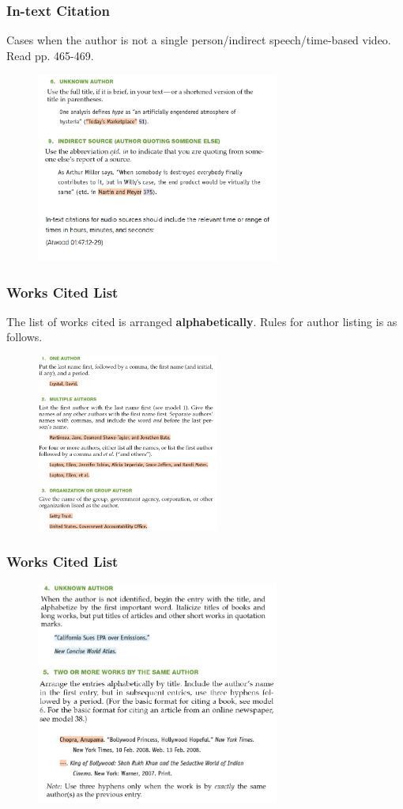 \documentclass{beamer}
\begin{document}
\begin{frame}
\frametitle{In-text Citation}
Cases when the author is not a single person/indirect speech/time-based video. Read pp. 465-469.
\begin{figure}[!htbp]
\center
\includegraphics[width=8cm]{author2.png}
\end{figure}
\end{frame}
\begin{frame}
\frametitle{Works Cited List}
The list of works cited is arranged \textbf{alphabetically}. Rules for author listing is as follows.
\begin{figure}[!htbp]
\center
\includegraphics[width=6cm]{author3.png}
\end{figure}
\end{frame}
\begin{frame}
\frametitle{Works Cited List}
\begin{figure}[!htbp]
\center
\includegraphics[width=8cm]{author4.png}
\end{figure}
\end{frame}
\end{document}
